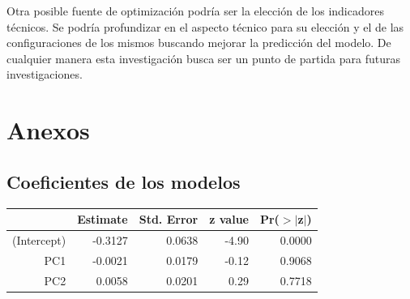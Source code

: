 \documentclass[a4paper,12pt]{Latex/Classes/PhDthesisPSnPDF}
\begin{document}
Otra posible fuente de optimización podría ser la elección de los indicadores técnicos. Se podría profundizar en el aspecto técnico para su elección y el de las configuraciones de los mismos buscando mejorar la predicción del modelo. De cualquier manera esta investigación busca ser un punto de partida para futuras investigaciones.



\chapter{Anexos}

\section{Coeficientes de los modelos}

\begin{center}
\begin{table}[ht]
\centering
\begin{tabular}{rrrrr}
  \hline
 & Estimate & Std. Error & z value & Pr($>$$|$z$|$) \\ 
  \hline
(Intercept) & -0.3127 & 0.0638 & -4.90 & 0.0000 \\ 
  PC1 & -0.0021 & 0.0179 & -0.12 & 0.9068 \\ 
  PC2 & 0.0058 & 0.0201 & 0.29 & 0.7718 \\ 
   \hline
\end{tabular}
\end{table}\end{center}
\end{document}
